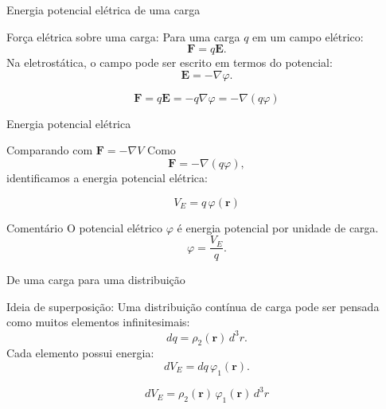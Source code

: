 \documentclass[aspectratio=169,11pt]{beamer}
\begin{document}
\begin{frame}{Energia potencial elétrica de uma carga}

\begin{mybox}{Força elétrica sobre uma carga: }
Para uma carga \(q\) em um campo elétrico:
\[
\mathbf F = q\mathbf E.
\]
Na eletrostática, o campo pode ser escrito em termos do potencial:
\[
\mathbf E = -\nabla \varphi.
\]
\end{mybox}

\begin{eqbox}
\begin{equation}
\mathbf F
=
q\mathbf E
=
-q\nabla\varphi
=
-\nabla(q\varphi)
\end{equation}
\end{eqbox}

\end{frame}

\begin{frame}{Energia potencial elétrica}

\begin{mybox}{Comparando com \(\mathbf F=-\nabla V\)}
Como
\[
\mathbf F = -\nabla(q\varphi),
\]
identificamos a energia potencial elétrica:
\end{mybox}

\begin{eqbox}
\begin{equation}
V_E = q\,\varphi(\mathbf r)
\tag{3.63}
\end{equation}
\end{eqbox}

\begin{alertblock}{Comentário}
O potencial elétrico \(\varphi\) é energia potencial por unidade de carga.
\[
\varphi = \frac{V_E}{q}.
\]
\end{alertblock}

\end{frame}

\begin{frame}{De uma carga para uma distribuição}

\begin{mybox}{Ideia de superposição: }
Uma distribuição contínua de carga pode ser pensada como muitos elementos infinitesimais:
\[
dq = \rho_2(\mathbf r)\,d^3r.
\]
Cada elemento possui energia:
\[
dV_E = dq\,\varphi_1(\mathbf r).
\]
\end{mybox}

\begin{eqbox}
\begin{equation}
dV_E
=
\rho_2(\mathbf r)\,\varphi_1(\mathbf r)\,d^3r
\end{equation}
\end{eqbox}

\end{frame}
\end{document}

